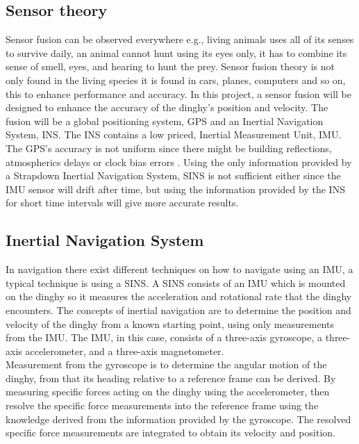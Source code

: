 
\subsection*{Sensor theory}
Sensor fusion can be observed everywhere e.g., living animals uses all of its senses to survive daily, an animal cannot hunt using its eyes only, it has to combine its sense of smell, eyes, and hearing to hunt the prey\cite{animal}. Sensor fusion theory is not only found in the living species it is found in cars, planes, computers and so on, this to enhance performance and accuracy. In this project, a sensor fusion will be designed to enhance the accuracy of the dinghy's position and velocity. The fusion will be a global positioning system, GPS and an Inertial Navigation System, INS. The INS contains a low priced, Inertial Measurement Unit, IMU.\\ 
The GPS's accuracy is not uniform since there might be building reflections, atmospherics delays or clock bias errors \cite{boken}. Using the only information provided by a Strapdown Inertial Navigation System, SINS is not sufficient either since the IMU sensor will drift after time, but using the information provided by the INS for short time intervals will give more accurate results.  

\subsection{Inertial Navigation System}
In navigation there exist different techniques on how to navigate using an IMU, a typical technique is using a SINS. A SINS consists of an IMU which is mounted on the dinghy so it measures the acceleration and rotational rate that the dinghy encounters.
The concepts of inertial navigation are to determine the position and velocity of the dinghy from a known starting point, using only measurements from the IMU. The IMU, in this case, consists of a three-axis gyroscope, a three-axis accelerometer, and a three-axis magnetometer. \\
Measurement from the gyroscope is to determine the angular motion of the dinghy, from that its heading relative to a reference frame can be derived.
By measuring specific forces acting on the dinghy using the accelerometer, then resolve the specific force measurements into the reference frame using the knowledge derived from the information provided by the gyroscope. 
The resolved specific force measurements are integrated to obtain its velocity and position. \cite{non-linear} 


